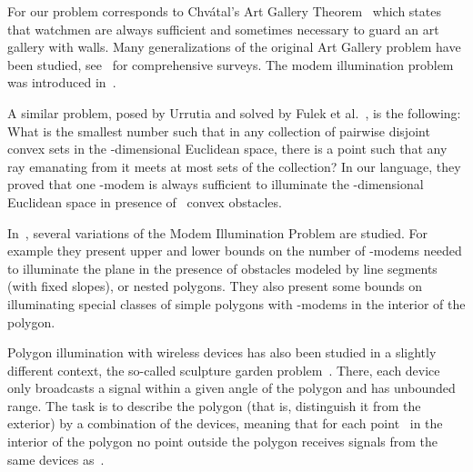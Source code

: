 \documentclass[A4]{article}
\begin{document}
For  our problem corresponds to Chv\'atal's Art Gallery Theorem~\cite{Chvatal} which states that  watchmen are always sufficient and sometimes necessary to guard an art gallery with  walls.
Many generalizations of the original Art Gallery problem have been studied, see~\cite{ORourke,Shermer,Urrutia} for comprehensive surveys.
The modem illumination problem was introduced in~\cite{Aich,Ruy}.

A similar problem, posed by Urrutia and solved by Fulek et al.~\cite{Pach}, is the following:
What is the smallest number  such that in any collection of  pairwise disjoint convex sets in the -dimensional Euclidean space, there is a point such that any ray emanating from it meets at most  sets of the collection?
In our language, they proved that one \mbox{-modem} is always sufficient to illuminate the -dimensional Euclidean space in presence of~ convex obstacles.

In~\cite{Ball}, several variations of the Modem Illumination Problem are studied.
For example they present upper and lower bounds on the number of \mbox{-modems} needed to illuminate the plane in the presence of obstacles modeled by line segments (with fixed slopes), or nested polygons.
They also present some bounds on illuminating special classes of simple polygons with \mbox{-modems} in the interior of the polygon.

Polygon illumination with wireless devices has also been studied in a slightly different context,  the so-called sculpture garden problem~\cite{EGS,CHOU}.  
There, each device only broadcasts a signal within a given angle of the polygon and has unbounded range.
The task is to describe the polygon (that is, distinguish it from the exterior) by a combination of the devices, meaning that for each point~ in the interior of the polygon no point outside the polygon receives signals from the same devices as~. 
\end{document}

